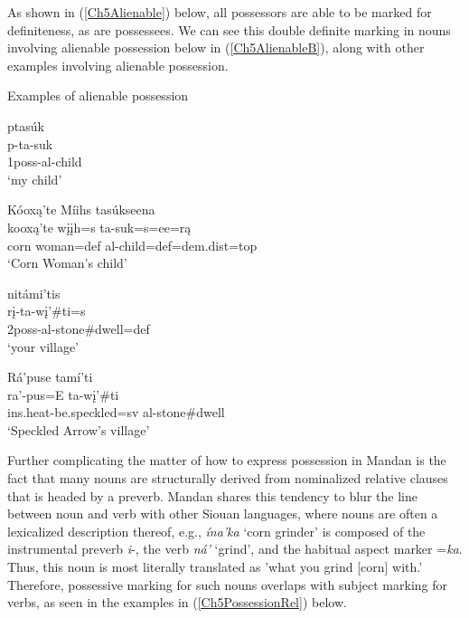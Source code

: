 As shown in (\ref{Ch5Alienable}) below, all possessors are able to be marked for definiteness, as are possessees. We can see this double definite marking in nouns involving alienable possession below in (\ref{Ch5AlienableB}), along with other examples involving alienable possession.

\begin{exe}
    \item\label{Ch5Alienable} Examples of alienable possession


    \begin{xlist}

        \item\label{Ch5AlienableA} \glll ptasúk\\
        p-ta-suk\\
        1poss-al-\textnormal{child}\\
        \glt `my child'
    
        \item\label{Ch5AlienableB} \glll Kóoxą'te Míihs tasúkseena\\
        kooxą'te wįįh=s ta-suk=s=ee=rą\\
        \textnormal{corn} \textnormal{woman}=def al-\textnormal{child}=def=dem.dist=top\\
        \glt `Corn Woman's child' \citep[112]{hollow1973a}

        \item\label{Ch5AlienableC} \glll nitámi'tis\\
        rį-ta-wį'\#ti=s\\
        2poss-al-\textnormal{stone}\#\textnormal{dwell}=def\\
        \glt `your village' \citep[217]{hollow1973a}

        \item\label{Ch5AlienableD} \glll Rá'puse tamí'ti\\
        ra'-pus=E ta-wį'\#ti\\
        ins.heat-\textnormal{be.speckled}=sv al-\textnormal{stone}\#\textnormal{dwell}\\
        \glt `Speckled Arrow's village' \citep[135]{hollow1973a}
    \end{xlist}
\end{exe}

Further complicating the matter of how to express possession in Mandan is the fact that many nouns are structurally derived from nominalized relative clauses that is headed by a preverb. Mandan shares this tendency to blur the line between noun and verb with other Siouan languages, where nouns are often a lexicalized description thereof, e.g., \textit{ína'ka} `corn grinder' is composed of the instrumental preverb \textit{i}-, the verb \textit{ná'} `grind', and the habitual aspect marker =\textit{ka}. Thus, this noun is most literally translated as 'what you grind [corn] with.' Therefore, possessive marking for such nouns overlaps with subject marking for verbs, as seen in the examples in (\ref{Ch5PossessionRel}) below.

